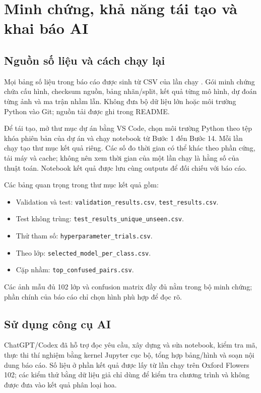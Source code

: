 \appendix
\section{Minh chứng, khả năng tái tạo và khai báo AI}
\subsection{Nguồn số liệu và cách chạy lại}
Mọi bảng số liệu trong báo cáo được sinh từ CSV của lần chạy \texttt{\RunID}. Gói minh chứng chứa cấu hình, checksum nguồn, bảng nhãn/split, kết quả từng mô hình, dự đoán từng ảnh và ma trận nhầm lẫn. Không đưa bộ dữ liệu lớn hoặc môi trường Python vào Git; nguồn tải được ghi trong README.

Để tái tạo, mở thư mục dự án bằng VS Code, chọn môi trường Python theo tệp khóa phiên bản của dự án và chạy notebook từ Bước 1 đến Bước 14. Mỗi lần chạy tạo thư mục kết quả riêng. Các số đo thời gian có thể khác theo phần cứng, tải máy và cache; không nên xem thời gian của một lần chạy là hằng số của thuật toán. Notebook kết quả được lưu cùng outputs để đối chiếu với báo cáo.

Các bảng quan trọng trong thư mục kết quả gồm:
\begin{itemize}
\item Validation và test: \texttt{validation\_results.csv}, \texttt{test\_results.csv}.
\item Test không trùng: \texttt{test\_results\_unique\_unseen.csv}.
\item Thử tham số: \texttt{hyperparameter\_trials.csv}.
\item Theo lớp: \texttt{selected\_model\_per\_class.csv}.
\item Cặp nhầm: \texttt{top\_confused\_pairs.csv}.
\end{itemize}
Các ảnh mẫu đủ 102 lớp và confusion matrix đầy đủ nằm trong bộ minh chứng; phần chính của báo cáo chỉ chọn hình phù hợp để đọc rõ.

\subsection{Sử dụng công cụ AI}
ChatGPT/Codex đã hỗ trợ đọc yêu cầu, xây dựng và sửa notebook, kiểm tra mã, thực thi thí nghiệm bằng kernel Jupyter cục bộ, tổng hợp bảng/hình và soạn nội dung báo cáo. Số liệu ở phần kết quả được lấy từ lần chạy trên Oxford Flowers 102; các kiểm thử bằng dữ liệu giả chỉ dùng để kiểm tra chương trình và không được đưa vào kết quả phân loại hoa.

